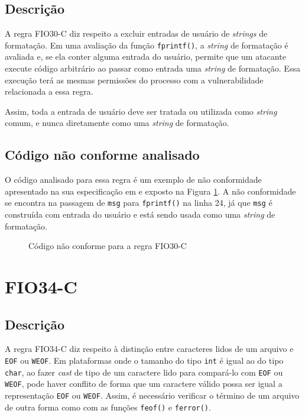 \subsection{Descrição}

A regra FIO30-C diz respeito a excluir entradas de usuário de \textit{strings} de formatação. Em uma avaliação da função \texttt{fprintf()}, a \textit{string} de formatação é avaliada e, se ela conter alguma entrada do usuário, permite que um atacante execute código arbitrário ao passar como entrada uma \textit{string} de formatação. Essa execução terá as mesmas permissões do processo com a vulnerabilidade relacionada a essa regra.

Assim, toda a entrada de usuário deve ser tratada ou utilizada como \textit{string} comum, e nunca diretamente como uma \textit{string} de formatação.

\subsection{Código não conforme analisado}

O código analisado para essa regra é um exemplo de não conformidade apresentado na sua especificação em \cite{ccert} e exposto na Figura \ref{fig:FIO30-C}. A não conformidade se encontra na passagem de \texttt{msg} para \texttt{fprintf()} na linha 24, já que \texttt{msg} é construída com entrada do usuário e está sendo usada como uma \textit{string} de formatação.

\begin{figure}[h!]
  \centering
  
  \caption{Código não conforme para a regra FIO30-C}
\label{fig:FIO30-C}
\end{figure}

\section{FIO34-C}
\subsection{Descrição}

A regra FIO34-C diz respeito à distinção entre caracteres lidos de um arquivo e \texttt{EOF} ou \texttt{WEOF}. Em plataformas onde o tamanho do tipo \texttt{int} é igual ao do tipo \texttt{char}, ao fazer \textit{cast} de tipo de um caractere lido para compará-lo com \texttt{EOF} ou \texttt{WEOF}, pode haver conflito de forma que um caractere válido possa ser igual a representação \texttt{EOF} ou \texttt{WEOF}. Assim, é necessário verificar o término de um arquivo de outra forma como com as funções \texttt{feof()} e \texttt{ferror()}.

